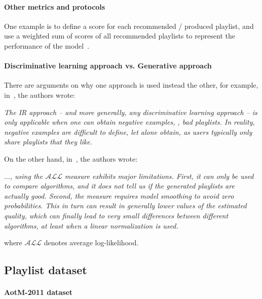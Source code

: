 \paragraph{Other metrics and protocols}
One example is to define a score for each recommended / produced playlist, 
and use a weighted sum of scores of all recommended playlists to represent the performance of the model~\cite{platt2002learning}.

\paragraph{Discriminative learning approach vs. Generative approach}
There are arguments on why one approach is used instead the other, for example, in~\cite{mcfee2011natural}, the authors wrote:
\begin{center}
\begin{minipage}[c]{.9\textwidth}
\it
The IR approach -- and more generally, any discriminative learning approach -- is only applicable when one can obtain negative examples, 
\ie, bad playlists. In reality, negative examples are difficult to define, let alone obtain, as users typically only share playlists that they like.
\end{minipage}
\end{center}

\noindent
On the other hand, in~\cite{bonnin2015automated}, the authors wrote:
\begin{center}
\begin{minipage}[c]{.9\textwidth}
\it
$\dots$, using the $\mathcal{ALL}$ measure exhibits major limitations.
First, it can only be used to compare algorithms, and it does not tell us if the generated playlists are actually good. 
Second, the measure requires model smoothing to avoid zero probabilities. 
This in turn can result in generally lower values of the estimated quality, 
which can finally lead to very small differences between different algorithms, at least when a linear normalization is used.
\end{minipage}
\end{center}
where $\mathcal{ALL}$ denotes average log-likelihood.


\subsection{Playlist dataset}
\paragraph{AotM-2011 dataset~\cite{mcfee2012hypergraph}}

